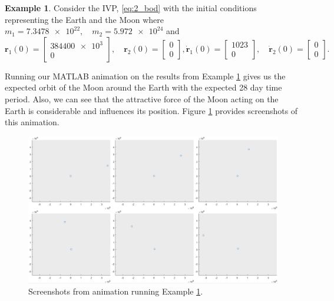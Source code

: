\documentclass[12pt, twoside]{report}
\theoremstyle{plain}
\theoremstyle{definition}
\theoremstyle{definition}
\newtheorem{example}{Example}[chapter]
\begin{document}
            \begin{example}
                Consider the IVP, \eqref{eq:2_bod} with the initial conditions 
                representing the Earth and the Moon where $m_1 = \num{7.3478e22},\quad m_2 = \num{5.972e24}$ and 
                \begin{equation}
                    \mathbf{r}_1(0)=    
                    \begin{bmatrix}
                        \num{384400e3} \\ 0
                    \end{bmatrix},
                    \quad
                    \mathbf{r}_2(0)=
                    \begin{bmatrix}
                        0 \\ 0
                    \end{bmatrix},
                    \dot{\mathbf{r}}_1(0)=
                    \begin{bmatrix}
                        \num{1023} \\ 0
                    \end{bmatrix},
                    \quad
                    \dot{\mathbf{r}}_2(0)=
                    \begin{bmatrix}
                        0 \\ 0
                    \end{bmatrix}.
                \end{equation}
                \label{5_ivp2}
            \end{example}

            Running our MATLAB animation on the results from Example \ref{5_ivp2}
            gives us the expected orbit of the Moon around the Earth with the expected
            28 day time period. Also, we can see that the attractive force of the Moon
            acting on the Earth is considerable and influences its position. Figure
            \ref{5_2_bod_an} provides screenshots of this animation.

            \begin{figure}[H]
                \centering
                    \includegraphics[width=\columnwidth]{2-body}
                    \caption{Screenshots from animation running Example 
                    \ref{5_ivp2}.}
                    \label{5_2_bod_an}
            \end{figure}
\end{document}
